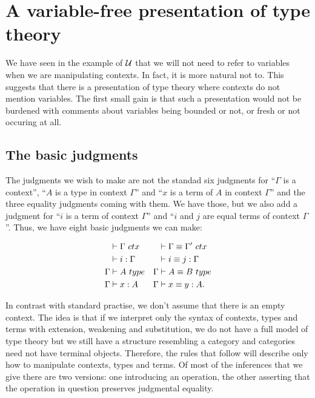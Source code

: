\section{A variable-free presentation of type theory}
We have seen in the example of $\mathcal{U}$ that we will not need to refer to variables
when we are manipulating contexts. In fact, it is more natural not to.
This suggests that there is a presentation
of type theory where contexts do not mention variables. The first small gain is that such a presentation
would not be burdened with comments about variables being bounded or not, or fresh or
not occuring at all.

\subsection{The basic judgments}
The judgments we wish to make are not the standad six judgments for ``$\Gamma$ is a context'', ``$A$ is
a type in context $\Gamma$'' and ``$x$ is a term of $A$ in context $\Gamma$'' and the three equality
judgments coming with them. We have those, but we also add a judgment for ``$i$ is a term of context $\Gamma$''
and ``$i$ and $j$ are equal terms of context $\Gamma$''. Thus, we have eight basic judgments we can make:

\begin{align*}
\jctx*{\Gamma} & \jctxeq*{\Gamma}{\Gamma'}\\
\jtermc*{\Gamma}{i} & \jtermceq*{\Gamma}{i}{j}\\
\jtype*{\Gamma}{A} & \jtypeeq*{\Gamma}{A}{B}\\
\jtermt*{\Gamma}{A}{x} & \jtermteq*{\Gamma}{A}{x}{y}.
\end{align*}

In contrast with standard practise, we don't assume that there is an empty context. The idea is that
if we interpret only the syntax of contexts, types and terms with extension, weakening and
substitution, we do not have a full model of type theory but we still have a 
structure resembling a category and categories need not have terminal objects. Therefore,
the rules that follow will describe only how to manipulate contexts, types and terms.
Of most of the inferences that we give there are two versions: one introducing an operation, the other asserting that the operation in question preserves judgmental equality. 

